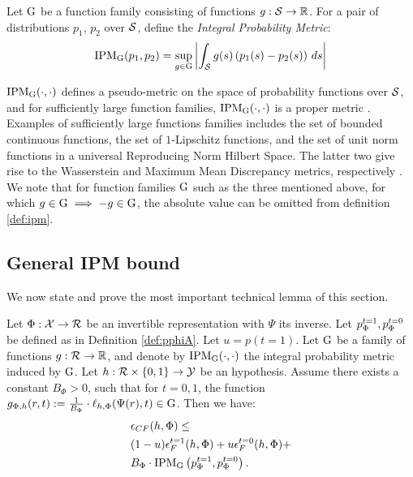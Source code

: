 \begin{thmappdef}\label{def:ipm}
Let $\mathrm{G}$ be a function family consisting of functions $g: \mathcal S\rightarrow \mathbb{R}$. For a pair of distributions $p_1$, $p_2$ over $\mathcal S$, define the \emph{Integral Probability Metric}:
$$\text{IPM}_{\mathrm{G}}(p_1,p_2) = \sup_{g\in \mathrm{G}} \left|\int_\mathcal S g(s) \left(p_1(s) - p_2(s)\right) \, ds \right|$$
\end{thmappdef}
$\text{IPM}_{\mathrm{G}}(\cdot,\cdot)$ defines a pseudo-metric on the space of probability functions over $\mathcal S$, and for sufficiently large function families, $\text{IPM}_{\mathrm{G}}(\cdot,\cdot)$ is a proper metric \cite{muller1997integral}. Examples of sufficiently large functions families includes the set of bounded continuous functions, the set of $1$-Lipschitz functions, and the set of unit norm functions in a universal Reproducing Norm Hilbert Space. The latter two give rise to the Wasserstein and Maximum Mean Discrepancy metrics, respectively \cite{gretton2012mmd,sriperumbudur2012empirical}. We note that for function families $\mathrm{G}$ such as the three mentioned above, for which $g \in \mathrm{G} \implies -g \in \mathrm{G}$, the absolute value can be omitted from definition \ref{def:ipm}.


\subsection{General IPM bound}


We now state and prove the most important technical lemma of this section.
\begin{thmapplem}\label{lem:genA}
Let $\Phi: \mathcal X \rightarrow \mathcal{R}$ be an invertible representation with $\Psi$ its inverse. Let $p^{t=1}_\Phi, p^{t=0}_\Phi$ be defined as in Definition \ref{def:pphiA}. Let $u = p(t=1)$. Let $\mathrm{G}$ be a family of functions $g:\mathcal{R} \rightarrow \mathbb{R}$, and denote by $\text{IPM}_{\mathrm{G}}(\cdot, \cdot)$ the integral probability metric induced by $\mathrm{G}$.  Let $h : \mathcal{R} \times \{0,1\} \rightarrow \mathcal Y$ be an hypothesis. Assume there exists a constant $B_\Phi>0$, such that for $t=0,1$, the function $g_{\Phi,h}(r,t) := \frac{1}{B_\Phi} \cdot  \ell_{h,\Phi}(\Psi(r),t) \in \mathrm{G}$. Then we have:
\begin{align}
&\epsilon_{CF}(h,\Phi) \leq \nonumber \\
&(1-u)  \epsilon^{t=1}_F(h,\Phi) + u  \epsilon^{t=0}_F(h,\Phi) + \nonumber \\ 
&  B_\Phi \cdot \text{IPM}_{\mathrm{G}}\left( p^{t=1}_\Phi, p^{t=0}_\Phi \right).
\end{align}
\end{thmapplem}

